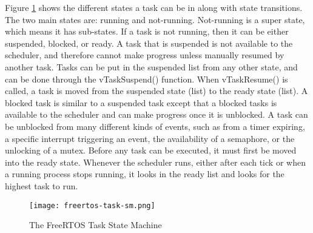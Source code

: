 Figure \ref{fig:freertos-task-sm} shows the different states a task can be in
along with state transitions. The two main states are: running and not-running.
Not-running is a super state, which means it has sub-states. If a task is not
running, then it can be either suspended, blocked, or ready. A task that is
suspended is not available to the scheduler, and therefore cannot make progress
unless manually resumed by another task. Tasks can be put in the suspended list
from any other state, and can be done through the vTaskSuspend() function. When
vTaskResume() is called, a task is moved from the suspended state (list) to the
ready state (list). A blocked task is similar to a suspended task except that a
blocked tasks is available to the scheduler and can make progress once it is
unblocked. A task can be unblocked from many different kinds of events, such as
from a timer expiring, a specific interrupt triggering an event, the
availability of a semaphore, or the unlocking of a mutex. Before any task can be
executed, it must first be moved into the ready state. Whenever the scheduler
runs, either after each tick or when a running process stops running, it looks
in the ready list and looks for the highest task to run.

\begin{figure}[h]
\centering
\texttt{[image: freertos-task-sm.png]}
\caption{The FreeRTOS Task State Machine}
\label{fig:freertos-task-sm}
\end{figure}

